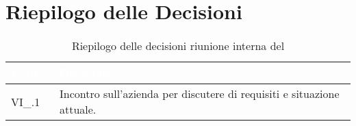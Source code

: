 \section{Riepilogo delle Decisioni}


\begin{table}[!htbp]
    \renewcommand{\arraystretch}{1.5}
    \begin{tabular}{m{}<{\centering}  m{}<{\centering}}
        \rowcolor{darkblue} \textcolor{white}{\textbf{Codice}} & \textcolor{white}{\textbf{Decisione}}                        \\
        \hline
        VI\_{}\D{}.1                                           & Incontro sull'azienda per discutere di requisiti e situazione attuale. \\
    \end{tabular}
    \caption{Riepilogo delle decisioni riunione interna del \D}
\end{table}